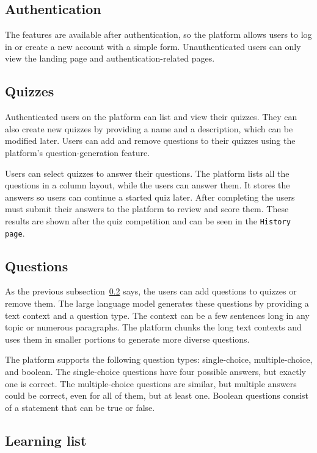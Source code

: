 \subsection{Authentication}

The features are available after authentication, so the platform allows users to log in or create a new account with a simple form. Unauthenticated users can only view the landing page and authentication-related pages.

\subsection{Quizzes}\label{subsec:quizzes}

Authenticated users on the platform can list and view their quizzes. They can also create new quizzes by providing a name and a description, which can be modified later. Users can add and remove questions to their quizzes using the platform's question-generation feature.

Users can select quizzes to answer their questions. The platform lists all the questions in a column layout, while the users can answer them. It stores the answers so users can continue a started quiz later. After completing the users must submit their answers to the platform to review and score them. These results are shown after the quiz competition and can be seen in the \texttt{History page}.

\subsection{Questions}

As the previous subsection~\ref{subsec:quizzes} says, the users can add questions to quizzes or remove them. The large language model generates these questions by providing a text context and a question type. The context can be a few sentences long in any topic or numerous paragraphs. The platform chunks the long text contexts and uses them in smaller portions to generate more diverse questions.

The platform supports the following question types: single-choice, multiple-choice, and boolean. The single-choice questions have four possible answers, but exactly one is correct. The multiple-choice questions are similar, but multiple answers could be correct, even for all of them, but at least one. Boolean questions consist of a statement that can be true or false.

\subsection{Learning list}

